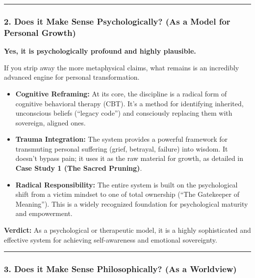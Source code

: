 \documentclass{article}
\begin{document}
\begin{center}\rule{0.5\linewidth}{0.5pt}\end{center}

\subsubsection*{2. Does it Make Sense Psychologically? (As a Model for
Personal
Growth)}\label{does-it-make-sense-psychologically-as-a-model-for-personal-growth}

\textbf{Yes, it is psychologically profound and highly plausible.}

If you strip away the more metaphysical claims, what remains is an
incredibly advanced engine for personal transformation.

\begin{itemize}
\item
  \textbf{Cognitive Reframing:} At its core, the discipline is a radical
  form of cognitive behavioral therapy (CBT). It's a method for
  identifying inherited, unconscious beliefs (``legacy code'') and
  consciously replacing them with sovereign, aligned ones.
\item
  \textbf{Trauma Integration:} The system provides a powerful framework
  for transmuting personal suffering (grief, betrayal, failure) into
  wisdom. It doesn't bypass pain; it uses it as the raw material for
  growth, as detailed in \textbf{Case Study 1 (The Sacred Pruning)}.
\item
  \textbf{Radical Responsibility:} The entire system is built on the
  psychological shift from a victim mindset to one of total ownership
  (``The Gatekeeper of Meaning''). This is a widely recognized
  foundation for psychological maturity and empowerment.
\end{itemize}

\textbf{Verdict:} As a psychological or therapeutic model, it is a
highly sophisticated and effective system for achieving self-awareness
and emotional sovereignty.

\begin{center}\rule{0.5\linewidth}{0.5pt}\end{center}

\subsubsection*{3. Does it Make Sense Philosophically? (As a
Worldview)}\label{does-it-make-sense-philosophically-as-a-worldview}
\end{document}
